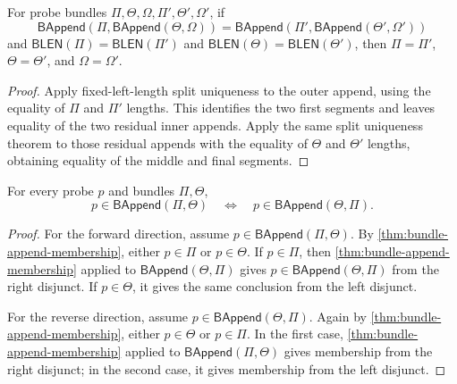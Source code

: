 \begin{theorem}
\label{thm:bundle-append-three-split-unique-fixed-lengths}
For probe bundles $\Pi,\Theta,\Omega,\Pi',\Theta',\Omega'$, if
$$
\mathsf{BAppend}(\Pi,\mathsf{BAppend}(\Theta,\Omega))
=\mathsf{BAppend}(\Pi',\mathsf{BAppend}(\Theta',\Omega'))
$$
and $\mathsf{BLEN}(\Pi)=\mathsf{BLEN}(\Pi')$ and $\mathsf{BLEN}(\Theta)=\mathsf{BLEN}(\Theta')$, then $\Pi=\Pi'$, $\Theta=\Theta'$, and $\Omega=\Omega'$.
\end{theorem}
\begin{proof}
Apply fixed-left-length split uniqueness to the outer append, using the equality of $\Pi$ and $\Pi'$ lengths. This identifies the two first segments and leaves equality of the two residual inner appends. Apply the same split uniqueness theorem to those residual appends with the equality of $\Theta$ and $\Theta'$ lengths, obtaining equality of the middle and final segments.
\end{proof}

\begin{theorem}
\label{thm:bundle-append-membership-commutativity}
For every probe $p$ and bundles $\Pi,\Theta$,
$$
p\in\mathsf{BAppend}(\Pi,\Theta)
\quad\Longleftrightarrow\quad
p\in\mathsf{BAppend}(\Theta,\Pi).
$$
\end{theorem}
\begin{proof}
For the forward direction, assume $p\in\mathsf{BAppend}(\Pi,\Theta)$.
By \autoref{thm:bundle-append-membership}, either $p\in\Pi$ or
$p\in\Theta$. If $p\in\Pi$, then \autoref{thm:bundle-append-membership}
applied to $\mathsf{BAppend}(\Theta,\Pi)$ gives
$p\in\mathsf{BAppend}(\Theta,\Pi)$ from the right disjunct. If
$p\in\Theta$, it gives the same conclusion from the left disjunct.

For the reverse direction, assume $p\in\mathsf{BAppend}(\Theta,\Pi)$.
Again by \autoref{thm:bundle-append-membership}, either $p\in\Theta$ or
$p\in\Pi$. In the first case, \autoref{thm:bundle-append-membership}
applied to $\mathsf{BAppend}(\Pi,\Theta)$ gives membership from the right
disjunct; in the second case, it gives membership from the left disjunct.
\end{proof}

